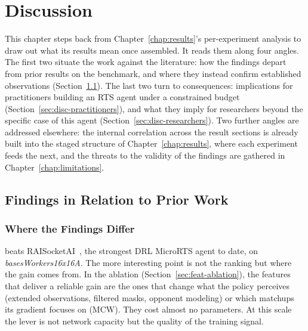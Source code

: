 \chapter{Discussion}
\label{chap:discussion}

This chapter steps back from Chapter~\ref{chap:results}'s per-experiment analysis to draw out what its results mean once assembled. It reads them along four angles. The first two situate the work against the literature: how the findings depart from prior results on the benchmark, and where they instead confirm established observations (Section~\ref{sec:disc-priorwork}). The last two turn to consequences: implications for practitioners building an RTS agent under a constrained budget (Section~\ref{sec:disc-practitioners}), and what they imply for researchers beyond the specific case of this agent (Section~\ref{sec:disc-researchers}). Two further angles are addressed elsewhere: the internal correlation across the result sections is already built into the staged structure of Chapter~\ref{chap:results}, where each experiment feeds the next, and the threats to the validity of the findings are gathered in Chapter~\ref{chap:limitations}.

\vspace*{-0.2cm}

\section{Findings in Relation to Prior Work}
\label{sec:disc-priorwork}

\vspace*{-0.05cm}

\subsection{Where the Findings Differ}

 beats RAISocketAI~\cite{goodfriendCompetitionWinningDeep2024}, the strongest DRL MicroRTS agent to date, on \emph{basesWorkers16x16A}. The more interesting point is not the ranking but where the gain comes from. In the ablation (Section~\ref{sec:feat-ablation}), the features that deliver a reliable gain are the ones that change what the policy perceives (extended observations, filtered masks, opponent modeling) or which matchups its gradient focuses on (MCW). They cost almost no parameters. At this scale the lever is not network capacity but the quality of the training signal.

